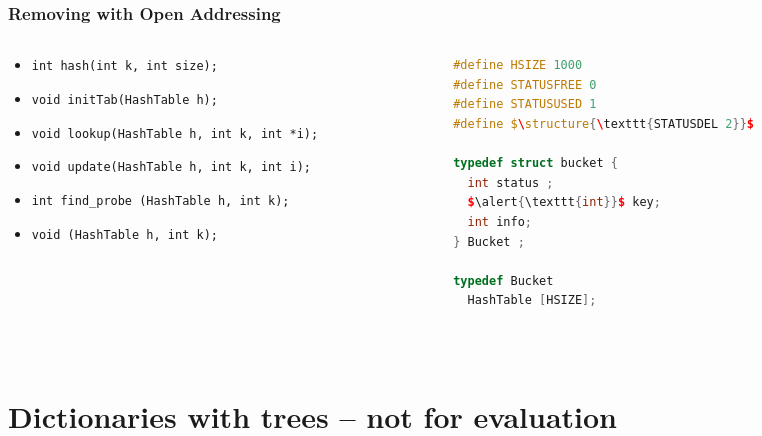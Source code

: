 \documentclass[aspectratio=169]{beamer}
\begin{document}
\begin{frame}[fragile]\frametitle{Removing with Open Addressing}
\begin{columns}
\begin{column}{.71\textwidth}
%
\begin{itemize}
  \item \textcolor{black!40}{\texttt{int hash(\alert{\texttt{int}} k, int size);}}
  \item \textcolor{black!40}{\texttt{void initTab(HashTable h);}}
  \item \textcolor{black!40}{\texttt{void lookup(HashTable h, \alert{\texttt{int}} k, int *i);}}
  \item \textcolor{black!40}{\texttt{void update(HashTable h, \alert{\texttt{int}} k, int i);}}
  \item \textcolor{black!40}{\texttt{int find\_probe (HashTable h, \alert{\texttt{int}} k);}}
  \item \texttt{void (HashTable h, \alert{\texttt{int}} k);}
\end{itemize}
%
\end{column}
\begin{column}{.34\textwidth}
%
\begin{lstlisting}[language=C++,emph={HashTable,Bucket}]
#define HSIZE 1000
#define STATUSFREE 0
#define STATUSUSED 1
#define $\structure{\texttt{STATUSDEL 2}}$

typedef struct bucket {
  int status ;
  $\alert{\texttt{int}}$ key;
  int info;
} Bucket ;

typedef Bucket
  HashTable [HSIZE];
\end{lstlisting}
%
\end{column}
\end{columns}

~\\[-6mm]
\doSimpleExercise{How would you implement \texttt{update}?
\\How would you implement a \emph{garbageCollect} that removes deleted cells? 
\\What is their complexity?}
\end{frame}

\section{Dictionaries with trees -- not for evaluation}

\end{document}
